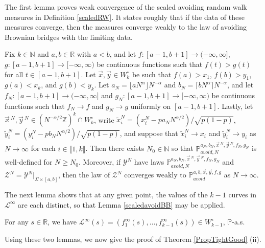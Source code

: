The first lemma proves weak convergence of the scaled avoiding random walk measures in Definition \ref{scaledRW}. It states roughly that if the data of these measures converge, then the measures converge weakly to the law of avoiding Brownian bridges with the limiting data.

\begin{lemma}\label{scaledavoidBB}
	Fix $k\in\mathbb{N}$ and $a,b\in\mathbb{R}$ with $a<b$, and let $f:[a-1,b+1]\to(-\infty,\infty]$, $g:[a-1,b+1]\to[-\infty,\infty)$ be continuous functions such that $f(t) > g(t)$ for all $t\in[a-1,b+1]$. Let $\vec{x},\vec{y}\in W_k^\circ$ be such that $f(a) > x_1$, $f(b) > y_1$, $g(a) < x_k$, and $g(b) < y_k$. Let $a_N = \lfloor aN^\alpha\rfloor N^{-\alpha}$ and $b_N = \lceil bN^\alpha\rceil N^{-\alpha}$, and let $f_N : [a-1,b+1]\to(-\infty,\infty]$ and $g_N : [a-1,b+1]\to[-\infty,\infty)$ be continuous functions such that $f_N\to f$ and $g_N\to g$ uniformly on $[a-1,b+1]$. Lastly, let $\vec{x}\,^N, \vec{y}\,^N \in (N^{-\alpha/2}\mathbb{Z})^k \cap W_k^\circ$, write $\tilde{x}^N_i = (x_i^N - pa_N N^{\alpha/2})/\sqrt{p(1-p)}$, $\tilde{y}^N_i = (y_i^N - pb_N N^{\alpha/2})/\sqrt{p(1-p)}$, and suppose that $\tilde{x}^N_i \to x_i$ and $\tilde{y}^N_i \to y_i$ as $N\to\infty$ for each $i\in\llbracket 1,k\rrbracket$. Then there exists $N_0 \in \mathbb{N}$ so that $\mathbb{P}^{a_N,b_N,\vec{x}\,^N,\vec{y}\,^N,f_N,g_N}_{avoid,N}$ is well-defined for $N\geq N_0$. Moreover, if $\mathcal{Y}^N$ have laws $\mathbb{P}^{a_N,b_N,\vec{x}\,^N,\vec{y}\,^N,f_N,g_N}_{avoid,N}$ and $\mathcal{Z}^N = \mathcal{Y}^N|_{\Sigma\times[a,b]}$, then the law of $\mathcal{Z}^N$ converges weakly to $\mathbb{P}^{a,b,\vec{x},\vec{y},f,g}_{avoid}$ as $N\to\infty$.
\end{lemma}

The next lemma shows that at any given point, the values of the $k-1$ curves in $\mathcal{L}^\infty$ are each distinct, so that Lemma \ref{scaledavoidBB} may be applied.

\begin{lemma}\label{inftydistinct}
	For any $s\in\mathbb{R}$, we have $\mathcal{L}^\infty(s) = (f_1^\infty(s),\dots,f_{k-1}^\infty(s)) \in W^\circ_{k-1}$, $\mathbb{P}$-a.s.
\end{lemma}

Using these two lemmas, we now give the proof of Theorem \ref{PropTightGood} (ii).

